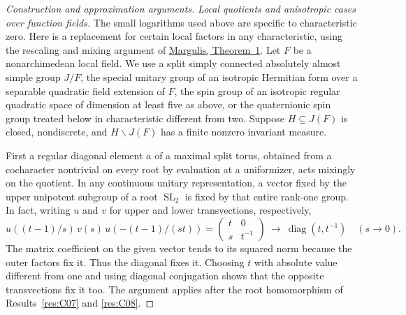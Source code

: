 \documentclass[11pt,a4paper,openany,oneside]{book}
\theoremstyle{resultstyle}
\theoremstyle{definition}
\numberwithin{equation}{chapter}
\begin{document}
\begin{proof}[Construction and approximation arguments]
\medskip\noindent
\textit{Local quotients and anisotropic cases over function fields.}
The small logarithms used above are specific to characteristic
zero. Here is a replacement for certain local factors in any
characteristic, using the rescaling and mixing argument of
\href{https://doi.org/10.1007/BF01081890}{Margulis, Theorem~1}.
Let \(F\) be a nonarchimedean local field. We use a split
simply connected absolutely almost simple group \(J/F\),
the special unitary group of an isotropic Hermitian
form over a separable quadratic field extension of \(F\),
the spin group of an isotropic regular quadratic
space of dimension at least five as above, or the
quaternionic spin group treated below in characteristic
different from two.
Suppose \(H\subseteq J(F)\) is closed, nondiscrete, and
\(H\backslash J(F)\) has a finite nonzero invariant measure.

First a regular diagonal element \(a\) of a maximal split torus,
obtained from a cocharacter nontrivial on every root by
evaluation at a uniformizer, acts mixingly on the quotient.
In any continuous unitary representation, a vector fixed
by the upper unipotent subgroup of a root \(\operatorname{SL}_2\)
is fixed by that entire rank-one group. In fact, writing \(u\)
and \(v\) for upper and lower transvections, respectively,
\[
 u((t-1)/s)\,v(s)\,u(-(t-1)/(st))
   =\begin{pmatrix}t&0\\s&t^{-1}\end{pmatrix}
     \ \longrightarrow\ \operatorname{diag}(t,t^{-1})
 \quad(s\to0).
\]
The matrix coefficient on the given vector tends to its squared
norm because the outer factors fix it. Thus the diagonal fixes
it. Choosing \(t\) with absolute value different from one and
using diagonal conjugation shows that the opposite transvections
fix it too. The argument applies after the root homomorphism
of Results~\ref{res:C07} and \ref{res:C08}.


\end{proof}
\end{document}
